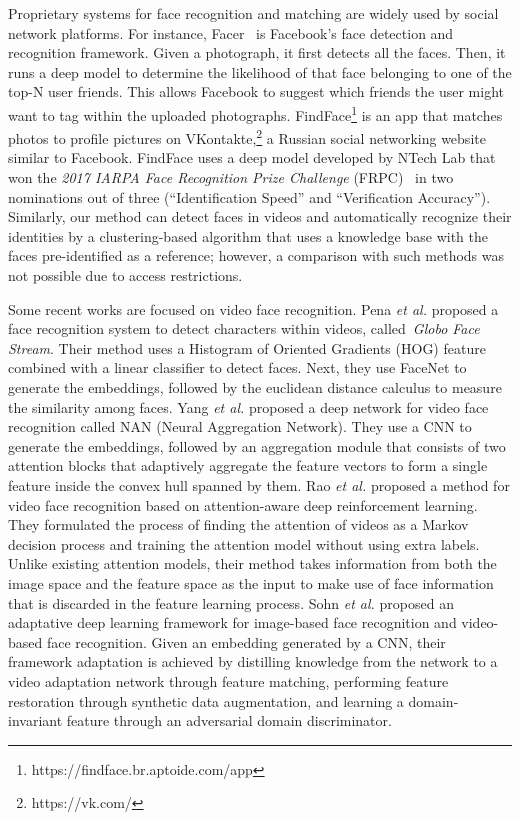 Proprietary systems for face recognition and matching are widely used by social network platforms. For instance, Facer~\cite{hazelwood2018applied} is Facebook's face detection and recognition framework. Given a photograph, it first detects all the faces. Then, it runs a  deep model to determine the likelihood of that face belonging to one of the top-N user friends. This allows  Facebook to suggest which friends the user might want to tag within the uploaded photographs. FindFace\footnote{https://findface.br.aptoide.com/app} is an app that matches photos to profile pictures on VKontakte,\footnote{https://vk.com/} a Russian social networking website similar to Facebook. FindFace uses a deep model developed by NTech Lab that won the \textit{2017 IARPA Face Recognition Prize Challenge} (FRPC)~\cite{grother20172017}  in two nominations out of three (“Identification Speed” and “Verification Accuracy”). Similarly, our method can detect faces in videos and automatically recognize their identities by a clustering-based algorithm that uses a knowledge base with the faces pre-identified as a reference; however, a comparison with such methods was not possible due to access restrictions.

Some recent works are focused on video face recognition. Pena \emph{et al.} \cite{globofacestream} proposed a face recognition system to detect characters within videos, called~\textit{Globo Face Stream}. Their method uses a Histogram of Oriented Gradients (HOG) feature combined with a linear classifier to detect faces. Next, they use  FaceNet to generate the embeddings, followed by the euclidean distance calculus to measure the similarity among faces. Yang \emph{et al.} \cite{yang2017neural} proposed a deep network for video face recognition called NAN (Neural Aggregation Network). They use a CNN to generate the embeddings, followed by an aggregation module that consists of two attention blocks that adaptively aggregate the feature vectors to form a single feature inside the convex hull spanned by them. Rao \emph{et al.} \cite{rao2017attention} proposed a method for video face recognition based on attention-aware deep reinforcement learning. They formulated the process of finding the attention of videos as a Markov decision process and training the attention model without using extra labels. Unlike existing attention models, their method takes information from both the image space and the feature space as the input to make use of face information that is discarded in the feature learning process. Sohn \emph{et al.} \cite{sohn2017unsupervised} proposed an adaptative deep learning framework for image-based face recognition and video-based face recognition. Given an embedding generated by a CNN, their framework adaptation is achieved by distilling knowledge from the network to a video adaptation network through feature matching, performing feature restoration through synthetic data augmentation, and learning a domain-invariant feature through an adversarial domain discriminator. 

